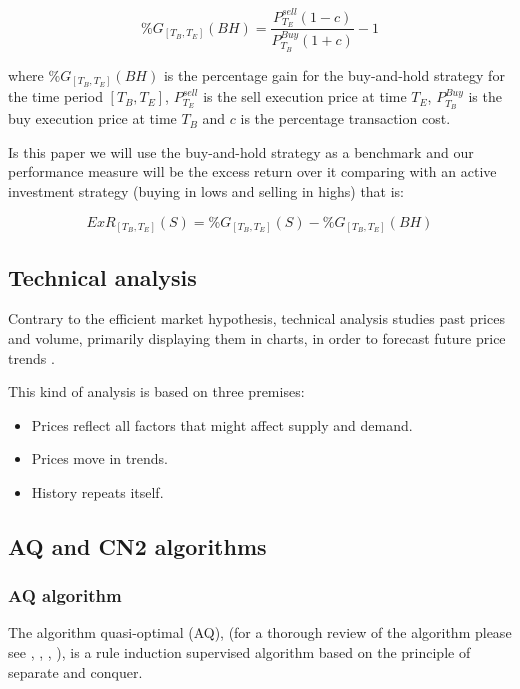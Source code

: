 \documentclass[preprint,3p,twocolumn]{elsarticle}
\begin{document}
\begin{equation} \label{eqn:buy-and-hold gain}
\%G_{ \left[T_{B}, T_{E} \right]} (BH) = \dfrac{P_{T_{E}}^{sell}  (1 - c)}{P_{T_{B}}^{Buy}  (1 + c)} - 1
\end{equation}

where $\%G_{ \left[T_{B}, T_{E} \right]} (BH)$ is the percentage gain for the buy-and-hold strategy for the time period $\left[T_{B}, T_{E} \right]$, $P_{T_{E}}^{sell}$ is the sell execution price at time $T_{E}$, $P_{T_{B}}^{Buy}$ is the buy execution price at time $T_{B}$ and $c$ is the percentage transaction cost.

Is this paper we will use the buy-and-hold strategy as a benchmark and our performance measure will be the excess return over it comparing with an active investment strategy (buying in lows and selling in highs) that is:

\begin{equation} \label{eqn:excess return}
ExR_{ \left[T_{B}, T_{E} \right]} (S) = \%G_{ \left[T_{B}, T_{E} \right]}(S)  - \%G_{ \left[T_{B}, T_{E} \right]}(BH)
\end{equation}

\subsection{Technical analysis}
\label{subsec:Technical analysis}
Contrary to the efficient market hypothesis, technical analysis studies past prices and volume, primarily displaying them in charts, in order to forecast future price trends \cite{murphy1999technical}.

This kind of analysis is based on three premises:

\begin{itemize}
\item Prices reflect all factors that might affect supply and demand.
\item Prices move in trends.
\item History repeats itself.
\end{itemize}


\subsection{AQ and CN2 algorithms}
\label{subsec:algorithms}

\subsubsection{AQ algorithm}
\label{subsubsec: aq algorithm}
The algorithm quasi-optimal (AQ), (for a thorough review of the algorithm please see \cite{michalski1969quasi}, \cite{AQMichalski1991}, \cite{AQCervone2010}, \cite{AQWojtusiak2012}), is a rule induction supervised algorithm based on the principle of separate and conquer.
\end{document}
